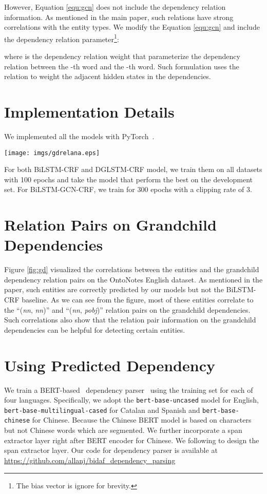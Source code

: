 \documentclass[11pt,a4paper]{article}
\begin{document}
However, Equation \ref{equ:gcn} does not include the dependency relation information. 
As mentioned in the main paper, such relations have strong correlations with the entity types. 
We modify the Equation \ref{equ:gcn} and include the dependency relation parameter\footnote{The bias vector is ignore for brevity.}:

where  is the dependency relation weight that parameterize the dependency relation  between the -th word and the -th word. 
Such formulation uses the relation to weight the adjacent hidden states in the dependencies. 

\section{Implementation Details}
We implemented all the models with PyTorch~\cite{paszke2017automatic}.
\begin{figure*}[t!]
	\centering
	\texttt{[image: imgs/gdrelana.eps]}
	\caption{Correlations between the entity types and the dependency relation pairs on the grandchild dependencies.}
	\label{fig:gd}
\end{figure*}
For both BiLSTM-CRF and DGLSTM-CRF model, we train them on all datasets with 100 epochs and take the model that perform the best on the development set. 
For BiLSTM-GCN-CRF, we train for 300 epochs with a clipping rate of 3. 


\section{Relation Pairs on Grandchild Dependencies}
Figure \ref{fig:gd} visualized the correlations between the entities and the grandchild dependency relation pairs on the OntoNotes English dataset. 
As mentioned in the paper, such entities are correctly predicted by our models but not the BiLSTM-CRF baseline. 
As we can see from the figure, most of these entities correlate to the ``(\textit{nn}, \textit{nn})'' and ``(\textit{nn}, \textit{pobj})'' relation pairs on the grandchild dependencies. 
Such correlations also show that the relation pair information on the grandchild dependencies can be helpful for detecting certain entities. 



\section{Using Predicted Dependency}

We train a BERT-based~\cite{devlin2019bert} dependency parser~\cite{dozat2017deep} using the training set for each of four languages. 
Specifically, we adopt the \texttt{bert-base-uncased} model for English, \texttt{bert-base-multilingual-cased} for Catalan and Spanish and \texttt{bert-base-chinese} for Chinese.
Because the Chinese BERT model is based on characters but not Chinese words which are segmented. 
We further incorporate a span extractor layer right after BERT encoder for Chinese. 
We following \citet{lee2017end} to design the span extractor layer. Our code for dependency parser is available at \url{https://github.com/allanj/bidaf_dependency_parsing}
\end{document}
